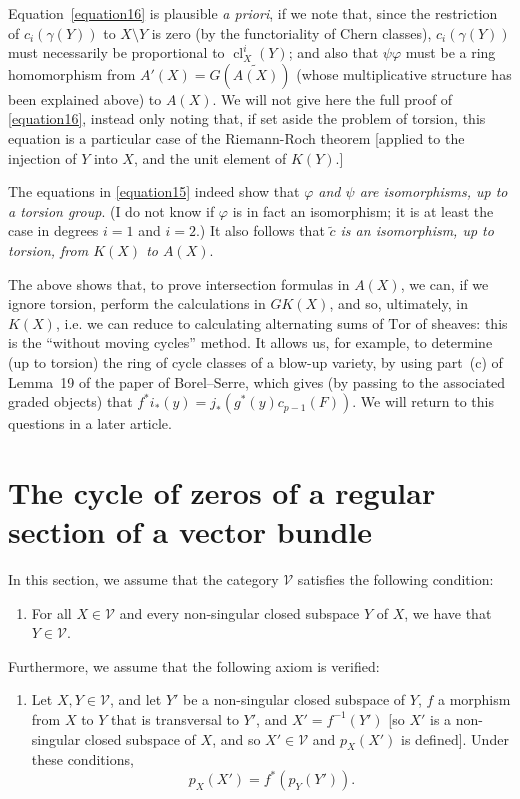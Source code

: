 \documentclass{article}
\theoremstyle{plain}
\theoremstyle{definition}
\newcommand{\cat}[1]{{\mathcal{#1}}}
\DeclareMathOperator{\cl}{cl}
\begin{document}
\begin{enumerate}
    Equation~\cref{equation16} is plausible \emph{a priori}, if we note that, since the restriction of $c_i(\gamma(Y))$ to $X\setminus Y$ is zero (by the functoriality of Chern classes), $c_i(\gamma(Y))$ must necessarily be proportional to $\cl_X^i(Y)$;
    and also that $\psi\varphi$ must be a ring homomorphism from $A'(X)=G(\widetilde{A(X)})$ (whose multiplicative structure has been explained above) to $A(X)$.
    We will not give here the full proof of \cref{equation16}, instead only noting that, if set aside the problem of torsion, this equation is a particular case of the Riemann-Roch theorem [applied to the injection of $Y$ into $X$, and the unit element of $K(Y)$.]

    The equations in \cref{equation15} indeed show that \emph{$\varphi$ and $\psi$ are isomorphisms, up to a torsion group}.
    (I do not know if $\varphi$ is in fact an isomorphism;
    it is at least the case in degrees $i=1$ and $i=2$.)
    It also follows that \emph{$\widetilde{c}$ is an isomorphism, up to torsion, from $K(X)$ to $A(X)$}.

    The above shows that, to prove intersection formulas in $A(X)$, we can, if we ignore torsion, perform the calculations in $GK(X)$, and so, ultimately, in $K(X)$, i.e. we can reduce to calculating alternating sums of $\mathrm{Tor}$ of sheaves:
    this is the ``without moving cycles'' method.
    It allows us, for example, to determine (up to torsion) the ring of cycle classes of a blow-up variety, by using part~(c) of Lemma~19 of the paper of Borel--Serre, which gives (by passing to the associated graded objects) that $f^*i_*(y) = j_*(g^*(y)c_{p-1}(F))$.
    We will return to this questions in a later article.
\end{enumerate}


\section{The cycle of zeros of a regular section of a vector bundle}
\label{section5}

In this section, we assume that the category $\cat{V}$ satisfies the following condition:
\begin{enumerate}[({V}2)]
  \item\label{axiomV2}
    For all $X\in\cat{V}$ and every non-singular closed subspace $Y$ of $X$, we have that $Y\in\cat{V}$.
\end{enumerate}

Furthermore, we assume that the following axiom is verified:
\begin{enumerate}[({A}5)]
  \item\label{axiomA5}
    Let $X,Y\in\cat{V}$, and let $Y'$ be a non-singular closed subspace of $Y$, $f$ a morphism from $X$ to $Y$ that is transversal to $Y'$, and $X'=f^{-1}(Y')$ [so $X'$ is a non-singular closed subspace of $X$, and so $X'\in\cat{V}$ and $p_X(X')$ is defined].
    Under these conditions,
    \[
      p_X(X') = f^*(p_Y(Y')).
    \]
\end{enumerate}
\end{document}
